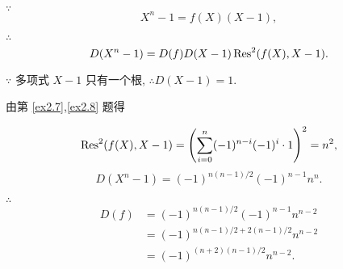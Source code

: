 \documentclass[color=black,device=normal,lang=cn,mode=geye]{elegantnote}
\begin{document}
\begin{solution}
    $\because$
    \[X^n-1=f(X)(X-1),\]

    $\therefore$
    \[D(X^n-1)=D(f)D(X-1)\operatorname{Res} ^2(f(X),X-1).\]

    $\because$ 多项式 $X-1$ 只有一个根, $\therefore D(X-1)=1$.

    由第 \ref{ex2.7},\ref{ex2.8} 题得

    \[\operatorname{Res} ^2(f(X),X-1)=\left(\sum\limits_{i=0}^n(-1)^{n-i}(-1)^i\cdot1\right)^2=n^2,\]
    \[D(X^n-1)=(-1)^{n(n-1)/2}(-1)^{n-1}n^n.\]

    $\therefore$
    \begin{align*}
        D(f) & =(-1)^{n(n-1)/2}(-1)^{n-1}n^{n-2} \\
        & =(-1)^{n(n-1)/2+2(n-1)/2}n^{n-2} \\
        & =(-1)^{(n+2)(n-1)/2}n^{n-2}.
    \end{align*}
\end{solution}
\end{document}
